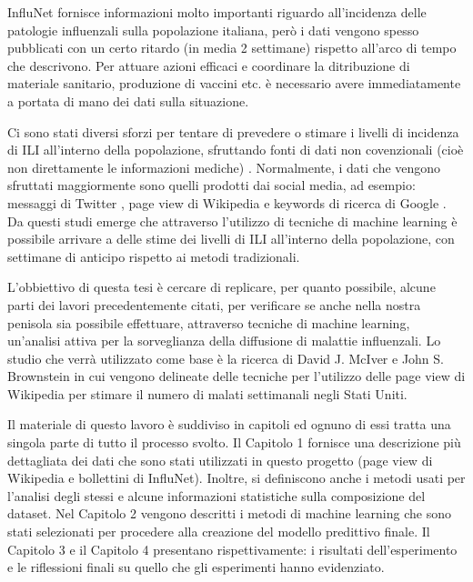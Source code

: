 InfluNet fornisce informazioni molto importanti riguardo all'incidenza delle patologie influenzali sulla popolazione
italiana, però i dati vengono spesso pubblicati con un certo ritardo (in media 2 settimane) rispetto all'arco di tempo che 
descrivono. Per attuare azioni efficaci e coordinare la ditribuzione di materiale sanitario, produzione di vaccini etc. è 
necessario avere immediatamente a portata di mano dei dati sulla situazione. 
\bigskip

Ci sono stati diversi sforzi per tentare di prevedere o stimare i livelli di incidenza di ILI all'interno della popolazione,
sfruttando fonti di dati non covenzionali (cioè non direttamente le informazioni mediche) \cite{McIver2014, Hickmann2015, Generous2014, googleflutrends, Signorini2011}. Normalmente, i dati che vengono sfruttati 
maggiormente sono quelli prodotti dai social media, ad esempio: messaggi di Twitter \cite{Signorini2011}, page view di 
Wikipedia \cite{McIver2014, Hickmann2015, Generous2014} e keywords di ricerca di Google \cite{googleflutrends}. Da questi 
studi emerge che attraverso l'utilizzo di tecniche di machine learning è possibile arrivare a delle stime dei livelli di ILI 
all'interno della popolazione, con settimane di anticipo rispetto ai metodi tradizionali.
\bigskip

L'obbiettivo di questa tesi è cercare di replicare, per quanto possibile, alcune parti dei lavori precedentemente citati, per
verificare se anche nella nostra penisola sia possibile effettuare, attraverso tecniche di machine learning, un'analisi
attiva per la sorveglianza della diffusione di malattie influenzali. Lo studio che verrà utilizzato come base 
è la ricerca di David J. McIver e John S. Brownstein \cite{McIver2014} in cui vengono delineate delle tecniche per 
l'utilizzo delle page view di Wikipedia per stimare il numero di malati settimanali negli Stati Uniti.
\bigskip

Il materiale di questo lavoro è suddiviso in capitoli ed ognuno di essi tratta una singola parte di tutto il processo svolto. 
Il Capitolo 1 fornisce una descrizione più dettagliata dei dati che sono stati utilizzati in questo progetto
(page view di Wikipedia e bollettini di InfluNet). Inoltre, si definiscono anche i metodi usati per l'analisi degli stessi e 
alcune informazioni statistiche sulla composizione del dataset.
Nel Capitolo 2 vengono descritti i metodi di machine learning che sono stati selezionati per procedere alla creazione
del modello predittivo finale.
Il Capitolo 3 e il Capitolo 4 presentano rispettivamente: i risultati dell'esperimento e le riflessioni finali su quello che
gli esperimenti hanno evidenziato.
\newpage




